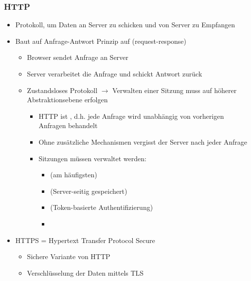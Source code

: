 \subsubsection*{HTTP}
\begin{itemize}
    \item Protokoll, um Daten an Server zu schicken und von Server zu Empfangen
    \item Baut auf Anfrage-Antwort Prinzip auf (request-response)
    \begin{itemize}
        \item Browser sendet Anfrage an Server
        \item Server verarbeitet die Anfrage und schickt Antwort zurück
        \item Zustandsloses Protokoll $\rightarrow$ Verwalten einer Sitzung muss auf höherer Abstraktionsebene erfolgen
        \begin{infoBox}
            \begin{itemize}
                \item HTTP ist , d.h. jede Anfrage wird unabhängig von vorherigen Anfragen behandelt
                \item Ohne zusätzliche Mechanismen vergisst der Server  nach jeder Anfrage
                \item Sitzungen müssen  verwaltet werden:
                \begin{itemize}
                    \item {} (am häufigsten)
                    \item {} (Server-seitig gespeichert)
                    \item {} (Token-basierte Authentifizierung)
                    \item {}
                \end{itemize}
            \end{itemize}
        \end{infoBox}
    \end{itemize}
    \item HTTPS = Hypertext Transfer Protocol Secure
    \begin{itemize}
        \item Sichere Variante von HTTP
        \item Verschlüsselung der Daten mittels TLS
    \end{itemize}
\end{itemize}
